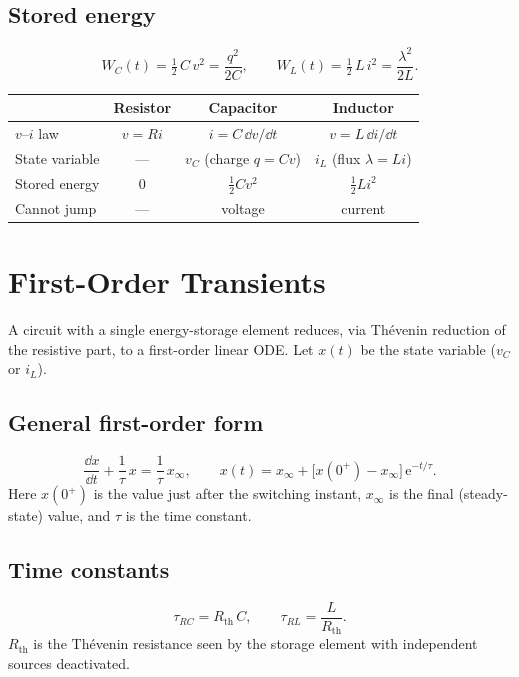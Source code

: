 \documentclass{essay}
\newcommand{\ee}{\mathrm{e}}
\begin{document}
\subsection{Stored energy}
\[ W_{C}(t) = \tfrac{1}{2}\,C\,v^{2} = \frac{q^{2}}{2C}, \qquad W_{L}(t) = \tfrac{1}{2}\,L\,i^{2} = \frac{\lambda^{2}}{2L}. \]

\begin{center}
  \begin{tabular}{@{}lccc@{}}
    \hline
    & \textbf{Resistor} & \textbf{Capacitor} & \textbf{Inductor}\\
    \hline
    \(v\)--\(i\) law      & \(v=Ri\)                 & \(i=C\,\dd v/\dd t\)
    & \(v=L\,\dd i/\dd t\)\\
    State variable    & ---                    & \(v_{C}\) (charge
    \(q=Cv\))    & \(i_{L}\) (flux \(\lambda=Li\))\\
    Stored energy     & \(0\)                    & \(\tfrac{1}{2} C v^{2}\)
    & \(\tfrac{1}{2} L i^{2}\)\\
    Cannot jump       & ---                    & voltage
    & current\\
    \hline
  \end{tabular}
\end{center}

\section{First-Order Transients}

A circuit with a single energy-storage element reduces, via Th\'evenin
reduction of the resistive part, to a first-order linear ODE. Let \(x(t)\) be the
state variable (\(v_{C}\) or \(i_{L}\)).

\subsection{General first-order form}
\[ \frac{\dd x}{\dd t} + \frac{1}{\tau}\,x = \frac{1}{\tau}\,x_{\infty}, \qquad x(t) = x_{\infty} + \bigl[x(0^+) - x_{\infty}\bigr]\,\ee^{-t/\tau}. \]
Here \(x(0^+)\) is the value just after the switching instant, \(x_{\infty}\) is the
final (steady-state) value, and \(\tau\) is the time constant.

\subsection{Time constants}
\[ \tau_{RC} = R_{\mathrm{th}}\,C, \qquad \tau_{RL} = \frac{L}{R_{\mathrm{th}}} . \]
\(R_{\mathrm{th}}\) is the Th\'evenin resistance seen by the storage element with
independent sources deactivated.
\end{document}
